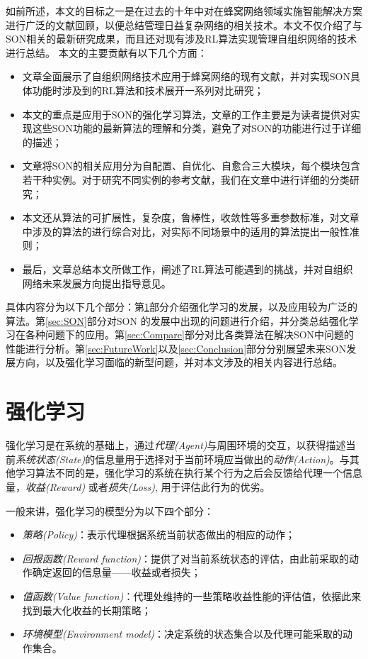 \documentclass{IEEEtran}
\begin{document}
如前所述，本文的目标之一是在过去的十年中对在蜂窝网络领域实施智能解决方案进行广泛的文献回顾，以便总结管理日益复杂网络的相关技术。本文不仅介绍了与SON相关的最新研究成果，而且还对现有涉及RL算法实现管理自组织网络的技术进行总结。
本文的主要贡献有以下几个方面：
\begin{itemize}
  \item 文章全面展示了自组织网络技术应用于蜂窝网络的现有文献，并对实现SON具体功能时涉及到的RL算法和技术展开一系列对比研究；
  \item 本文的重点是应用于SON的强化学习算法，文章的工作主要是为读者提供对实现这些SON功能的最新算法的理解和分类，避免了对SON的功能进行过于详细的描述；
  \item 文章将SON的相关应用分为自配置、自优化、自愈合三大模块，每个模块包含若干种实例。对于研究不同实例的参考文献，我们在文章中进行详细的分类研究；
  \item 本文还从算法的可扩展性，复杂度，鲁棒性，收敛性等多重参数标准，对文章中涉及的算法的进行综合对比，对实际不同场景中的适用的算法提出一般性准则；
  \item 最后，文章总结本文所做工作，阐述了RL算法可能遇到的挑战，并对自组织网络未来发展方向提出指导意见。
\end{itemize}

具体内容分为以下几个部分：第\ref{sec:RL}部分介绍强化学习的发展，以及应用较为广泛的算法。第\ref{sec:SON}部分对SON 的发展中出现的问题进行介绍，并分类总结强化学习在各种问题下的应用。第\ref{sec:Compare}部分对比各类算法在解决SON中问题的性能进行分析。第\ref{sec:FutureWork}以及\ref{sec:Conclusion}部分分别展望未来SON发展方向，以及强化学习面临的新型问题，并对本文涉及的相关内容进行总结。
\section{强化学习}
\label{sec:RL}

强化学习是在系统的基础上，通过\emph{代理(Agent)}与周围环境的交互，以获得描述当前\emph{系统状态(State)}的信息量用于选择对于当前环境应当做出的\emph{动作(Action)}。与其他学习算法不同的是，强化学习的系统在执行某个行为之后会反馈给代理一个信息量，\emph{收益(Reward)} 或者\emph{损失(Loss)}, 用于评估此行为的优劣\cite{Sutton1998}。

一般来讲，强化学习的模型分为以下四个部分：
\begin{itemize}
\item \emph{策略(Policy)}：表示代理根据系统当前状态做出的相应的动作；
\item \emph{回报函数(Reward function)}：提供了对当前系统状态的评估，由此前采取的动作确定返回的信息量——收益或者损失；
\item \emph{值函数(Value function)}：代理处维持的一些策略收益性能的评估值，依据此来找到最大化收益的长期策略；
\item \emph{环境模型(Environment model)}：决定系统的状态集合以及代理可能采取的动作集合。
\end{itemize}
\end{document}
